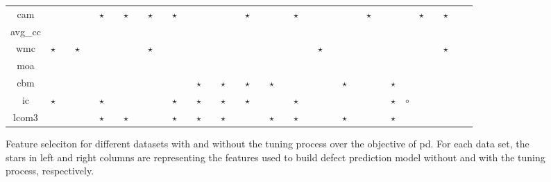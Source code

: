 \documentclass{sig-alternative}
\begin{document}
\begin{figure}[!ht]
\begin{tabular}{c|c c|c c|c c|c c|c c|c c|c c|c c|c c|c c|c c|c c|c c|c c|c c|c c|c c|c }
cam& & & & & $\star$& & $\star$& & $\star$& & $\star$& & & & & & $\star$& & & & $\star$& & & & & & $\star$& & & & $\star$& & $\star$& \\
avg\_cc& & & & & & & & & & & & & & & & & & & & & & & & & & & & & & & & & & \\
wmc& $\star$& & $\star$& & & & & & $\star$& & & & & & & & & & & & & & $\star$& & & & & & & & & & $\star$& \\
moa& & & & & & & & & & & & & & & & & & & & & & & & & & & & & & & & & & \\
cbm& & & & & & & & & & & & & $\star$& & $\star$& & $\star$& & $\star$& & & & & & $\star$& & & & $\star$& & & & & \\
ic& $\star$& & & & $\star$& & & & & & $\star$& & $\star$& & $\star$& & $\star$& & & & $\star$& & & & & & & & $\star$& $\circ$& & & & \\
lcom3& & & & & $\star$& & $\star$& & & & $\star$& & $\star$& & $\star$& & & & $\star$& & $\star$& & & & $\star$& & & & $\star$& & & & & \\

  \end{tabular}
    \caption{Feature seleciton for different datasets with  and without the tuning process over the objective of pd. For each data set, the stars in left and right columns are representing the features used to build defect prediction model without and with the tuning process, respectively.
 }
\end{figure}

\end{document}
